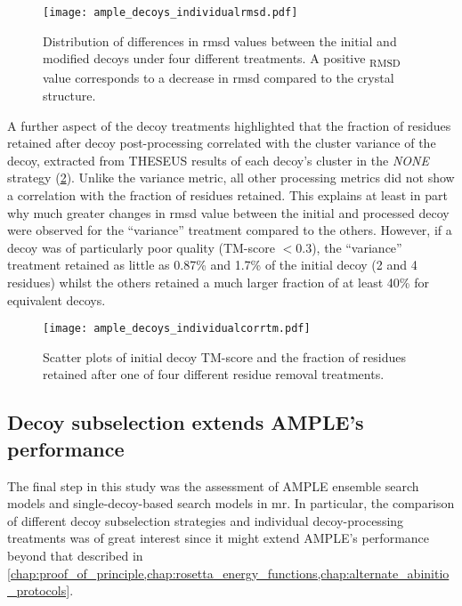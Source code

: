 \begin{figure}[H]
	\centering
	\texttt{[image: ample\_decoys\_individualrmsd.pdf]}
        \caption[Difference in RMSD for individually processed decoys]{Distribution of differences in \gls{rmsd} values between the initial and modified decoys under four different treatments. A positive \textDelta\textsubscript{RMSD} value corresponds to a decrease in \gls{rmsd} compared to the crystal structure.}
	\label{fig:ample_decoys_individualrmsd}
\end{figure}

A further aspect of the decoy treatments highlighted that the fraction of residues retained after decoy post-processing correlated with the cluster variance of the decoy, extracted from THESEUS results of each decoy's cluster in the \textit{NONE} strategy (\cref{fig:ample_decoys_individualcorrtm}). Unlike the variance metric, all other processing metrics did not show a correlation with the fraction of residues retained. This explains at least in part why much greater changes in \gls{rmsd} value between the initial and processed decoy were observed for the ``variance'' treatment compared to the others. However, if a decoy was of particularly poor quality (TM-score $<0.3$), the ``variance'' treatment retained as little as 0.87\% and 1.7\% of the initial decoy (2 and 4 residues) whilst the others retained a much larger fraction of at least 40\% for equivalent decoys.

\begin{figure}[H]
        \centering
        \texttt{[image: ample\_decoys\_individualcorrtm.pdf]}
        \caption[Relationship between decoy quality and fraction of residues retained]{Scatter plots of initial decoy TM-score and the fraction of residues retained after one of four different residue removal treatments.}
        \label{fig:ample_decoys_individualcorrtm}
\end{figure}

\subsection{Decoy subselection extends AMPLE's performance}
The final step in this study was the assessment of AMPLE ensemble search models and single-decoy-based search models in \gls{mr}. In particular, the comparison of different decoy subselection strategies and individual decoy-processing treatments was of great interest since it might extend AMPLE's performance beyond that described in \cref{chap:proof_of_principle,chap:rosetta_energy_functions,chap:alternate_abinitio_protocols}.


